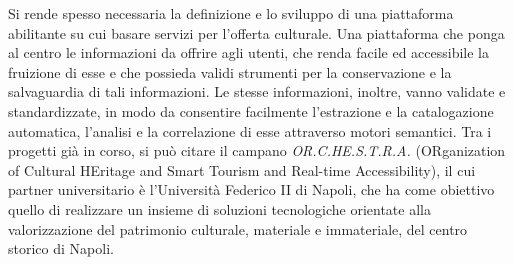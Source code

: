 Si rende spesso necessaria la definizione e lo sviluppo di una piattaforma abilitante su cui basare servizi per l'offerta culturale. Una piattaforma che ponga al centro le informazioni da offrire agli utenti, che renda facile ed accessibile la fruizione di esse e che possieda validi strumenti per la conservazione e la salvaguardia di tali informazioni.
Le stesse informazioni, inoltre, vanno validate e standardizzate, in modo da consentire facilmente l'estrazione e la catalogazione automatica, l'analisi e la correlazione di esse attraverso motori semantici.
Tra i progetti già in corso, si può citare il campano
\emph{OR.C.HE.S.T.R.A.} (ORganization of Cultural HEritage and Smart Tourism and Real-time Accessibility), il cui partner universitario è l'Università Federico II di Napoli, che ha come obiettivo quello di realizzare un insieme di soluzioni tecnologiche orientate alla valorizzazione del patrimonio culturale, materiale e immateriale, del centro storico di Napoli. 

